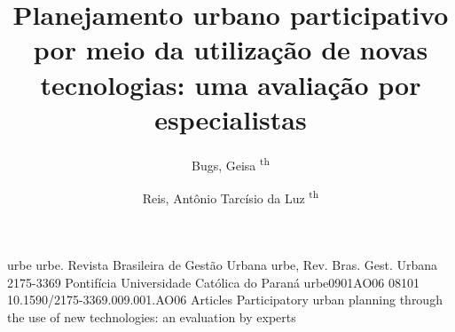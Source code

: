 \documentclass{article}
\begin{document}
\title{Planejamento urbano participativo por meio da utilização de novas
					tecnologias: uma avaliação por especialistas}
\author[%
\textsuperscript{th}
]{%
Bugs, %
Geisa
\textsuperscript{th}
}
\author[%
\textsuperscript{th}
]{%
Reis, %
Antônio Tarcísio da Luz
\textsuperscript{th}
}

\maketitle

urbe%
urbe. Revista Brasileira de Gestão Urbana%
urbe, Rev. Bras. Gest.
					Urbana%
2175-3369%
Pontifícia Universidade Católica do Paraná%
urbe0901AO06%
08101%
10.1590/2175-3369.009.001.AO06%
Articles%
Participatory urban planning through the use of new technologies:
						an evaluation by experts%
\end{document}
